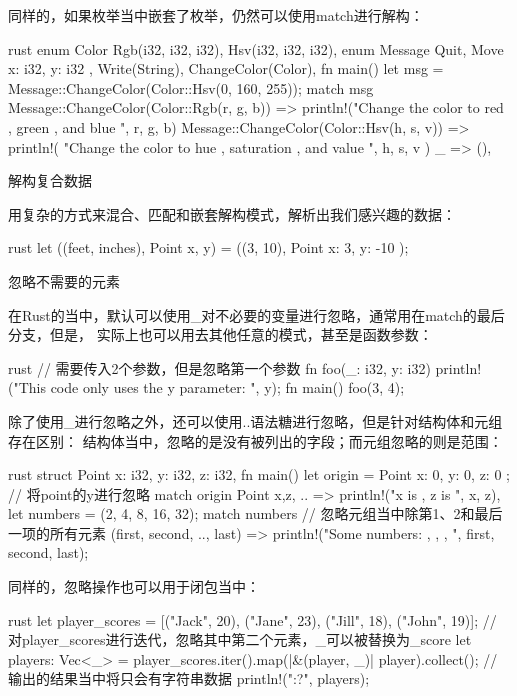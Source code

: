 \begin{outline}[enumerate]
同样的，如果枚举当中嵌套了枚举，仍然可以使用match进行解构：
\begin{code-block}{rust}
enum Color {
    Rgb(i32, i32, i32),
    Hsv(i32, i32, i32),
}
enum Message {
    Quit,
    Move { x: i32, y: i32 },
    Write(String),
    ChangeColor(Color),
}
fn main() {
    let msg = Message::ChangeColor(Color::Hsv(0, 160, 255));
    match msg {
        Message::ChangeColor(Color::Rgb(r, g, b)) => {
            println!("Change the color to red {}, green {}, and blue {}", r, g, b)
        }
        Message::ChangeColor(Color::Hsv(h, s, v)) => {
            println!(
                "Change the color to hue {}, saturation {}, and value {}",
                h, s, v
            )
        }
        _ => (),
    }
}
\end{code-block}

\1 解构复合数据

用复杂的方式来混合、匹配和嵌套解构模式，解析出我们感兴趣的数据：
\begin{code-block}{rust}
let ((feet, inches), Point {x, y}) = ((3, 10), Point { x: 3, y: -10 });
\end{code-block}

\1 忽略不需要的元素

在Rust的当中，默认可以使用\_对不必要的变量进行忽略，通常用在match的最后分支，但是，
实际上也可以用去其他任意的模式，甚至是函数参数：
\begin{code-block}{rust}
// 需要传入2个参数，但是忽略第一个参数
fn foo(_: i32, y: i32) {
    println!("This code only uses the y parameter: {}", y);
}
fn main() {
    foo(3, 4);
}
\end{code-block}

除了使用\_进行忽略之外，还可以使用..语法糖进行忽略，但是针对结构体和元组存在区别：
结构体当中，忽略的是没有被列出的字段；而元组忽略的则是范围：
\begin{code-block}{rust}
struct Point {
    x: i32,
    y: i32,
    z: i32,
}
fn main() {
    let origin = Point { x: 0, y: 0, z: 0 };
    // 将point的y进行忽略
    match origin {
        Point { x,z, .. } => println!("x is {}, z is {}", x, z),
    }
    let numbers = (2, 4, 8, 16, 32);
    match numbers {
        // 忽略元组当中除第1、2和最后一项的所有元素
        (first, second, .., last) => {
            println!("Some numbers: {}, {}, {}, ", first, second, last);
        }
    }
}
\end{code-block}

同样的，忽略操作也可以用于闭包当中：
\begin{code-block}{rust}
let player_scores = [("Jack", 20), ("Jane", 23), ("Jill", 18), ("John", 19)];
// 对player_scores进行迭代，忽略其中第二个元素，_可以被替换为_score
let players: Vec<_> = player_scores.iter().map(|&(player, _)| player).collect();
// 输出的结果当中将只会有字符串数据
println!("{:?}", players);
\end{code-block}


\end{outline}

